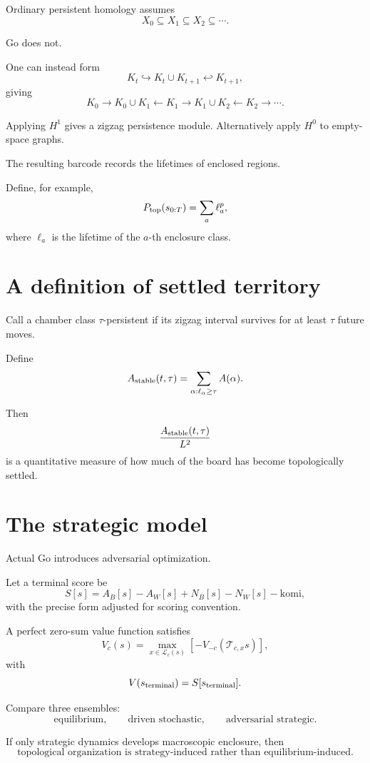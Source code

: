 \documentclass[11pt]{article}
\begin{document}
Ordinary persistent homology assumes
\[
X_0\subseteq X_1\subseteq X_2\subseteq\cdots.
\]

Go does not.

One can instead form
\[
K_t
\hookrightarrow
K_t\cup K_{t+1}
\hookleftarrow
K_{t+1},
\]
giving
\[
K_0
\rightarrow
K_0\cup K_1
\leftarrow
K_1
\rightarrow
K_1\cup K_2
\leftarrow
K_2
\rightarrow\cdots.
\]

Applying \(H^1\) gives a zigzag persistence module. Alternatively apply \(H^0\) to empty-space graphs.

The resulting barcode records the lifetimes of enclosed regions.

Define, for example,
\[
P_{\rm top}(s_{0:T})
=
\sum_a
\ell_a^p,
\]
where \(\ell_a\) is the lifetime of the \(a\)-th enclosure class.

\section{A definition of settled territory}

Call a chamber class \(\tau\)-persistent if its zigzag interval survives for at least \(\tau\) future moves.

Define
\[
A_{\rm stable}(t,\tau)
=
\sum_{\alpha:\ell_\alpha\geq\tau}
A(\alpha).
\]

Then
\[
\frac{A_{\rm stable}(t,\tau)}{L^2}
\]
is a quantitative measure of how much of the board has become topologically settled.

\section{The strategic model}

Actual Go introduces adversarial optimization.

Let a terminal score be
\[
S[s]
=
A_B[s]-A_W[s]
+
N_B[s]-N_W[s]
-\text{komi},
\]
with the precise form adjusted for scoring convention.

A perfect zero-sum value function satisfies
\[
V_c(s)
=
\max_{x\in\mathcal L_c(s)}
\left[
-V_{-c}(\mathcal T_{c,x}s)
\right],
\]
with
\[
V(s_{\rm terminal})=S[s_{\rm terminal}].
\]

Compare three ensembles:
\[
\text{equilibrium},
\qquad
\text{driven stochastic},
\qquad
\text{adversarial strategic}.
\]

If only strategic dynamics develops macroscopic enclosure, then
\[
\boxed{
\text{topological organization is strategy-induced rather than equilibrium-induced}.
}
\]
\end{document}
